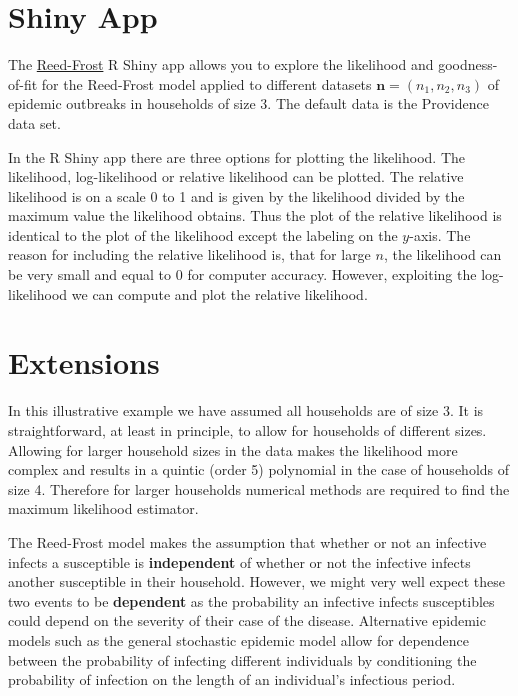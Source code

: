 \documentclass[
]{book}
\begin{document}
\hypertarget{sec_shiny}{%
\section{Shiny App}\label{sec_shiny}}

The \href{https://shiny.maths.nottingham.ac.uk/pmzpn/ReedFrost/}{Reed-Frost} R Shiny app allows you to explore the likelihood and goodness-of-fit for the Reed-Frost model applied to different datasets \(\mathbf{n}= (n_1,n_2,n_3)\) of epidemic outbreaks in households of size 3. The default data is the Providence data set.

In the R Shiny app there are three options for plotting the likelihood. The likelihood, log-likelihood or relative likelihood can be plotted. The relative likelihood is on a scale 0 to 1 and is given by the likelihood divided by the maximum value the likelihood obtains. Thus the plot of the relative likelihood is identical to the plot of the likelihood except the labeling on the \(y\)-axis. The reason for including the relative likelihood is, that for large \(n\), the likelihood can be very small and equal to 0 for computer accuracy. However, exploiting the log-likelihood we can compute and plot the relative likelihood.

\hypertarget{extensions}{%
\section{Extensions}\label{extensions}}

In this illustrative example we have assumed all households are of size 3. It is straightforward, at least in principle, to allow for households of different sizes. Allowing for larger household sizes in the data makes the likelihood more complex and results in a quintic (order 5) polynomial in the case of households of size 4. Therefore for larger households numerical methods are required to find the maximum likelihood estimator.

The Reed-Frost model makes the assumption that whether or not an infective infects a susceptible is \textbf{independent} of whether or not the infective infects another susceptible in their household. However, we might very well expect these two events to be \textbf{dependent} as the probability an infective infects susceptibles could depend on the severity of their case of the disease. Alternative epidemic models such as the general stochastic epidemic model allow for dependence between the probability of infecting different individuals by conditioning the probability of infection on the length of an individual's infectious period.
\end{document}

